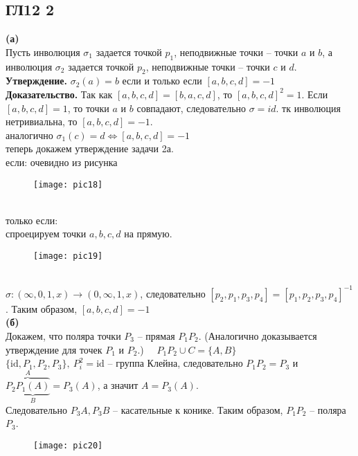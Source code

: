 \subsection*{ГЛ12 2}
\textbf{(а)}\\
Пусть инволюция $\sigma_1$ задается точкой $p_1$, неподвижные точки -- точки $a$ и $b$, а инволюция $\sigma_2$ задается точкой $p_2$,  неподвижные точки -- точки $c$ и $d$.\\
\vskip 0.2in
\noindent
\textbf{Утверждение.} $\sigma_2(a)=b$ если и только если $[a,b,c,d]=-1$\\
\textbf{Доказательство.} Так как $[a,b,c,d]=[b,a,c,d]$, то $[a,b,c,d]^2=1$. Если $[a,b,c,d]=1$, то точки $a$ и $b$ совпадают, следовательно $\sigma = id$. тк инволюция нетривиальна, то $[a,b,c,d]=-1$.\\
аналогично  $\sigma_1(c)=d \Leftrightarrow [a,b,c,d]=-1$\\
\vskip 0.2in
\noindent
теперь докажем утверждение задачи 2а.\\
если: очевидно из рисунка\\
\begin{figure}[h!]
\texttt{[image: pic18]}
\end{figure}\\
только если:\\
спроецируем точки $a, b, c, d$ на прямую.\\
\begin{figure}[h!]
\texttt{[image: pic19]}
\end{figure}\\
$\sigma: (\infty, 0, 1, x) \rightarrow (0, \infty, 1, x)$, следовательно $[p_2, p_1, p_3, p_4] = [p_1, p_2, p_3, p_4]^{-1}$. Таким образом, $[a,b,c,d]=-1$\\

\vskip 0.2in
\noindent
\textbf{(б)}\\
Докажем, что поляра точки $P_3$ -- прямая $P_1P_2$. (Аналогично доказывается утверждение для точек $P_1$ и $P_2$.) \ \ $P_1P_2 \cup C = \{A, B\}$\\
$\{\text{id}, P_1, P_2, P_3\},\ P_i^2 = \text{id}$ -- группа Клейна, следовательно $P_1P_2=P_3$ и 
$\overbrace{P_2 \underbrace{P_1(A)}_{B}}^{A} = P_3(A)$, а значит $A=P_3(A)$.\\
Следовательно $P_3A, P_3B$ -- касательные к конике. Таким образом, $P_1P_2$ -- поляра $P_3$.\\
\begin{figure}[h!]
	\texttt{[image: pic20]}
\end{figure}\\
		